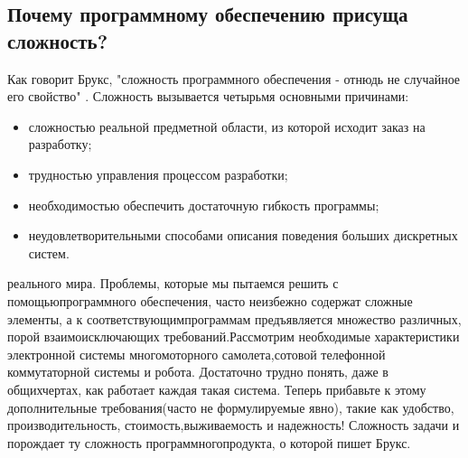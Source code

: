 \documentclass[10pt]{article}
\begin{document}
\subsection{Почему программному обеспечению присуща сложность?}
Как говорит Брукс, "сложность программного обеспечения - отнюдь не случайное его свойство" \cite{No Silver Bullet}. Сложность вызывается четырьмя основными причинами: 
\begin{itemize}
\item	\hspace{0.5cm}  сложностью реальной предметной области, из которой исходит заказ на разработку;
\item   \hspace{0.5cm} трудностью управления процессом разработки;
\item	\hspace{0.5cm} необходимостью обеспечить достаточную гибкость программы;
\item	\hspace{0.5cm} неудовлетворительными способами описания поведения больших дискретных систем.
\end{itemize}

{ реального мира.} Проблемы, которые мы пытаемся решить с помощью\linebreak  программного обеспечения, часто неизбежно содержат сложные элементы, а к соответствующим\linebreak  программам предъявляется множество различных, порой взаимоисключающих требований.\linebreak  Рассмотрим необходимые характеристики электронной системы многомоторного самолета,\linebreak  сотовой телефонной коммутаторной системы и робота. Достаточно трудно понять, даже в общих\linebreak  чертах, как работает каждая такая система. Теперь прибавьте к этому дополнительные требования\linebreak  (часто не формулируемые явно), такие как удобство, производительность, стоимость,\linebreak  выживаемость и надежность! Сложность задачи и порождает ту сложность программного\linebreak  продукта, о которой пишет Брукс.\vspace{3mm} 
\end{document}
